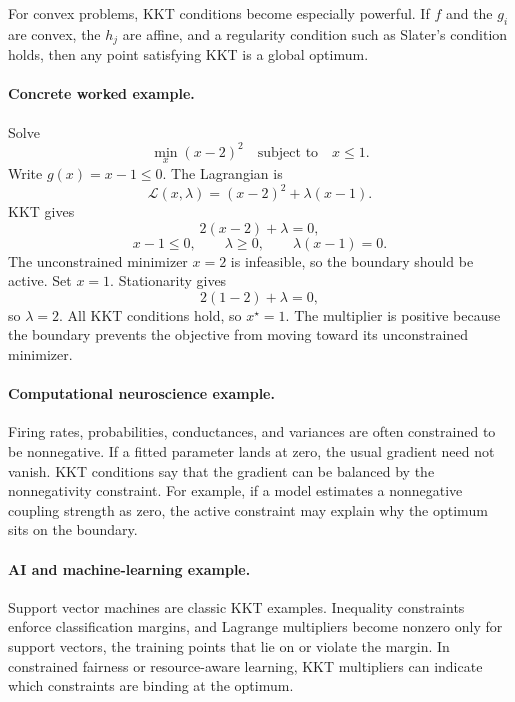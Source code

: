 For convex problems, KKT conditions become especially powerful. If \(f\) and the \(g_i\) are convex, the \(h_j\) are affine, and a regularity condition such as Slater's condition holds, then any point satisfying KKT is a global optimum.

\paragraph{Concrete worked example.}
Solve
\[
\min_x (x-2)^2
\quad\text{subject to}\quad
x\le 1.
\]
Write \(g(x)=x-1\le 0\). The Lagrangian is
\[
\mathcal L(x,\lambda)=(x-2)^2+\lambda(x-1).
\]
KKT gives
\[
2(x-2)+\lambda=0,
\]
\[
x-1\le 0,\qquad \lambda\ge 0,\qquad \lambda(x-1)=0.
\]
The unconstrained minimizer \(x=2\) is infeasible, so the boundary should be active. Set \(x=1\). Stationarity gives
\[
2(1-2)+\lambda=0,
\]
so \(\lambda=2\). All KKT conditions hold, so \(x^\star=1\). The multiplier is positive because the boundary prevents the objective from moving toward its unconstrained minimizer.

\paragraph{Computational neuroscience example.}
Firing rates, probabilities, conductances, and variances are often constrained to be nonnegative. If a fitted parameter lands at zero, the usual gradient need not vanish. KKT conditions say that the gradient can be balanced by the nonnegativity constraint. For example, if a model estimates a nonnegative coupling strength as zero, the active constraint may explain why the optimum sits on the boundary.

\paragraph{AI and machine-learning example.}
Support vector machines are classic KKT examples. Inequality constraints enforce classification margins, and Lagrange multipliers become nonzero only for support vectors, the training points that lie on or violate the margin. In constrained fairness or resource-aware learning, KKT multipliers can indicate which constraints are binding at the optimum.

